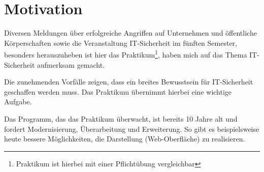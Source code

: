 \section{Motivation}
\label{sec:Motivation}
Diversen Meldungen über erfolgreiche Angriffen auf Unternehmen und öffentliche Körperschaften sowie die Veranstaltung IT-Sicherheit im fünften Semester, besonders herauszuheben ist hier das Praktikum\footnote{Praktikum ist hierbei mit einer Pflichtübung vergleichbar}, haben mich auf das Thema IT-Sicherheit aufmerksam gemacht. 

Die zunehmenden Vorfälle zeigen, dass ein breites Bewusstsein für IT-Sicherheit geschaffen werden muss. Das Praktikum übernimmt hierbei eine wichtige Aufgabe.

Das Programm, das das Praktikum überwacht, ist bereits 10 Jahre alt und fordert Modernisierung, Überarbeitung und Erweiterung. 
So gibt es beispielsweise heute bessere Möglichkeiten, die Darstellung (Web-Oberfläche) zu realisieren.